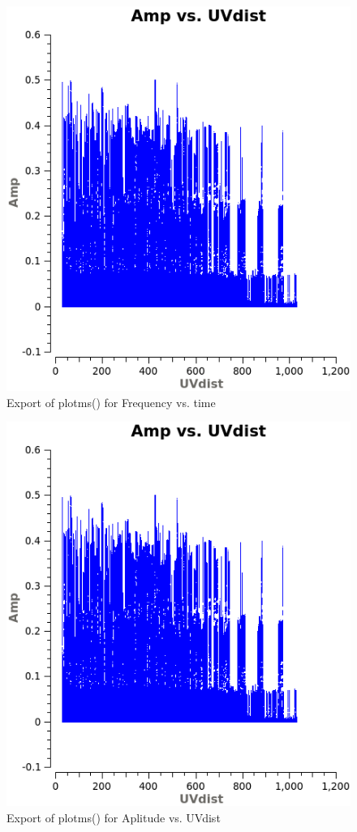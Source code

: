\documentclass[12pt, a4paper]{article}
\begin{document}
\begin{figure}[h!]
    \centering
    \includegraphics[scale=0.65]{../Imaging/plots/frequency_vs_time_vraag14-3.png}
    \caption{Export of plotms() for Frequency vs. time \label{fig:14-3}}
\end{figure}


\begin{figure}[h!]
    \centering
    \includegraphics[scale=0.65]{../Imaging/plots/Ampltide_vs_UVdist_vraag14-4.png}
    \caption{Export of plotms() for Aplitude vs. UVdist \label{fig:14-4}}
\end{figure}
\end{document}
